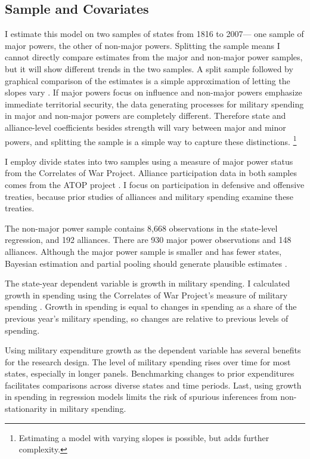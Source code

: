 \documentclass[12pt]{article}
\begin{document}
\subsection{Sample and Covariates} 

I estimate this model on two samples of states from 1816 to 2007--- one sample of major powers, the other of non-major powers. 
Splitting the sample means I cannot directly compare estimates from the major and non-major power samples, but it will show different trends in the two samples. 
A split sample followed by graphical comparison of the estimates is a simple approximation of letting the slopes vary \citep{GelmanHill2007}. If major powers focus on influence and non-major powers emphasize immediate territorial security, the data generating processes for military spending in major and non-major powers are completely different.
Therefore state and alliance-level coefficients besides strength will vary between major and minor powers, and splitting the sample is a simple way to capture these distinctions.
\footnote{Estimating a model with varying slopes is possible, but adds further complexity.} 



I employ divide states into two samples using a measure of major power status from the Correlates of War Project. 
Alliance participation data in both samples comes from the ATOP project \citep{Leedsetal2002}. 
I focus on participation in defensive and offensive treaties, because prior studies of alliances and military spending examine these treaties. 


The non-major power sample contains 8,668 observations in the state-level regression, and 192 alliances. 
There are 930 major power observations and 148 alliances. 
Although the major power sample is smaller and has fewer states, Bayesian estimation and partial pooling should generate plausible estimates \citep{Stegmueller2013}. 


The state-year dependent variable is growth in military spending.
I calculated growth in spending using the Correlates of War Project's measure of military spending \citep{SingerCINC1988}. 
Growth in spending is equal to changes in spending as a share of the previous year's military spending, so changes are relative to previous levels of spending. 


Using military expenditure growth as the dependent variable has several benefits for the research design. 
The level of military spending rises over time for most states, especially in longer panels. 
Benchmarking changes to prior expenditures facilitates comparisons across diverse states and time periods. 
Last, using growth in spending in regression models limits the risk of spurious inferences from non-stationarity in military spending.
\end{document}
